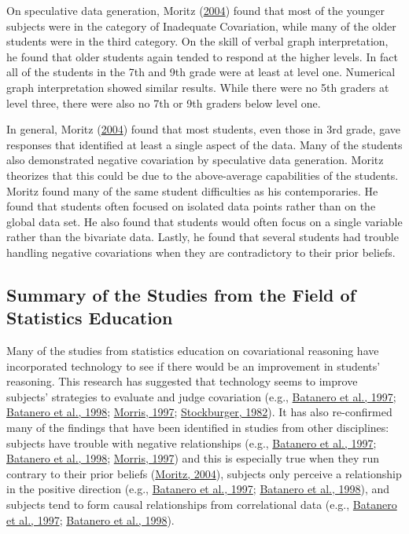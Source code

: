 \documentclass[11pt]{umnthesis}
\begin{document}
On speculative data generation, Moritz (\protect\hyperlink{ref-moritz:2004}{2004}) found that most of the younger subjects were in the category of Inadequate Covariation, while many of the older students were in the third category. On the skill of verbal graph interpretation, he found that older students again tended to respond at the higher levels. In fact all of the students in the 7th and 9th grade were at least at level one. Numerical graph interpretation showed similar results. While there were no 5th graders at level three, there were also no 7th or 9th graders below level one.

In general, Moritz (\protect\hyperlink{ref-moritz:2004}{2004}) found that most students, even those in 3rd grade, gave responses that identified at least a single aspect of the data. Many of the students also demonstrated negative covariation by speculative data generation. Moritz theorizes that this could be due to the above-average capabilities of the students. Moritz found many of the same student difficulties as his contemporaries. He found that students often focused on isolated data points rather than on the global data set. He also found that students would often focus on a single variable rather than the bivariate data. Lastly, he found that several students had trouble handling negative covariations when they are contradictory to their prior beliefs.

\hypertarget{summary-of-the-studies-from-the-field-of-statistics-education}{%
\subsection{Summary of the Studies from the Field of Statistics Education}\label{summary-of-the-studies-from-the-field-of-statistics-education}}

Many of the studies from statistics education on covariational reasoning have incorporated technology to see if there would be an improvement in students' reasoning. This research has suggested that technology seems to improve subjects' strategies to evaluate and judge covariation (e.g., \protect\hyperlink{ref-batanero:1997}{Batanero et al., 1997}; \protect\hyperlink{ref-batanero:1998}{Batanero et al., 1998}; \protect\hyperlink{ref-morris:1997}{Morris, 1997}; \protect\hyperlink{ref-stockburger:1982}{Stockburger, 1982}). It has also re-confirmed many of the findings that have been identified in studies from other disciplines: subjects have trouble with negative relationships (e.g., \protect\hyperlink{ref-batanero:1997}{Batanero et al., 1997}; \protect\hyperlink{ref-batanero:1998}{Batanero et al., 1998}; \protect\hyperlink{ref-morris:1997}{Morris, 1997}) and this is especially true when they run contrary to their prior beliefs (\protect\hyperlink{ref-moritz:2004}{Moritz, 2004}), subjects only perceive a relationship in the positive direction (e.g., \protect\hyperlink{ref-batanero:1997}{Batanero et al., 1997}; \protect\hyperlink{ref-batanero:1998}{Batanero et al., 1998}), and subjects tend to form causal relationships from correlational data (e.g., \protect\hyperlink{ref-batanero:1997}{Batanero et al., 1997}; \protect\hyperlink{ref-batanero:1998}{Batanero et al., 1998}).
\end{document}

